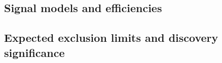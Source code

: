 \subsection{Signal models and efficiencies}
\label{subsec:darkmatter_models}


\subsection{Expected exclusion limits and discovery significance}
\label{subsec:darkmatter_results}



